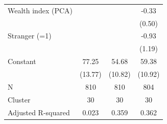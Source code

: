 {\begin{tabular}{l*{3}{c}}
Wealth index (PCA)  &                     &                     &       -0.33         \\
                    &                     &                     &      (0.50)         \\
Stranger (=1)       &                     &                     &       -0.93         \\
                    &                     &                     &      (1.19)         \\
Constant            &       77.25\sym{***}&       54.68\sym{***}&       59.38\sym{***}\\
                    &     (13.77)         &     (10.82)         &     (10.92)         \\
\midrule
N                   &         810         &         810         &         804         \\
Cluster             &          30         &          30         &          30         \\
Adjusted R-squared  &       0.023         &       0.359         &       0.362         \\
\bottomrule
\end{tabular}
}
